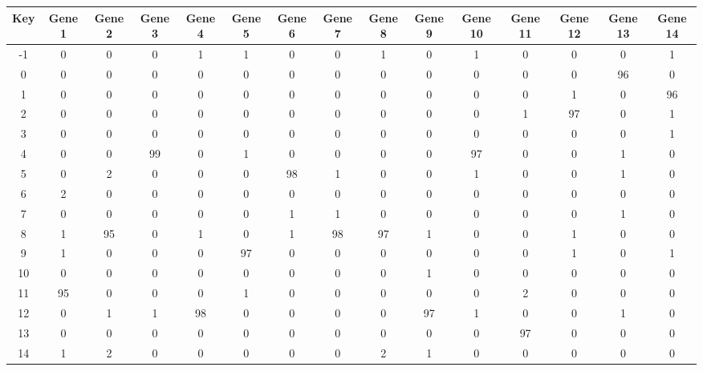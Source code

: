 \begin{tabular}{|c|c|c|c|c|c|c|c|c|c|c|c|c|c|c|}
\hline
Key & Gene 1 & Gene 2 & Gene 3 & Gene 4 & Gene 5 & Gene 6 & Gene 7 & Gene 8 & Gene 9 & Gene 10 & Gene 11 & Gene 12 & Gene 13 & Gene 14 \\
\hline
-1 & 0 & 0 & 0 & 1 & 1 & 0 & 0 & 1 & 0 & 1 & 0 & 0 & 0 & 1 \\
0 & 0 & 0 & 0 & 0 & 0 & 0 & 0 & 0 & 0 & 0 & 0 & 0 & 96 & 0 \\
1 & 0 & 0 & 0 & 0 & 0 & 0 & 0 & 0 & 0 & 0 & 0 & 1 & 0 & 96 \\
2 & 0 & 0 & 0 & 0 & 0 & 0 & 0 & 0 & 0 & 0 & 1 & 97 & 0 & 1 \\
3 & 0 & 0 & 0 & 0 & 0 & 0 & 0 & 0 & 0 & 0 & 0 & 0 & 0 & 1 \\
4 & 0 & 0 & 99 & 0 & 1 & 0 & 0 & 0 & 0 & 97 & 0 & 0 & 1 & 0 \\
5 & 0 & 2 & 0 & 0 & 0 & 98 & 1 & 0 & 0 & 1 & 0 & 0 & 1 & 0 \\
6 & 2 & 0 & 0 & 0 & 0 & 0 & 0 & 0 & 0 & 0 & 0 & 0 & 0 & 0 \\
7 & 0 & 0 & 0 & 0 & 0 & 1 & 1 & 0 & 0 & 0 & 0 & 0 & 1 & 0 \\
8 & 1 & 95 & 0 & 1 & 0 & 1 & 98 & 97 & 1 & 0 & 0 & 1 & 0 & 0 \\
9 & 1 & 0 & 0 & 0 & 97 & 0 & 0 & 0 & 0 & 0 & 0 & 1 & 0 & 1 \\
10 & 0 & 0 & 0 & 0 & 0 & 0 & 0 & 0 & 1 & 0 & 0 & 0 & 0 & 0 \\
11 & 95 & 0 & 0 & 0 & 1 & 0 & 0 & 0 & 0 & 0 & 2 & 0 & 0 & 0 \\
12 & 0 & 1 & 1 & 98 & 0 & 0 & 0 & 0 & 97 & 1 & 0 & 0 & 1 & 0 \\
13 & 0 & 0 & 0 & 0 & 0 & 0 & 0 & 0 & 0 & 0 & 97 & 0 & 0 & 0 \\
14 & 1 & 2 & 0 & 0 & 0 & 0 & 0 & 2 & 1 & 0 & 0 & 0 & 0 & 0 \\
\hline
\end{tabular}